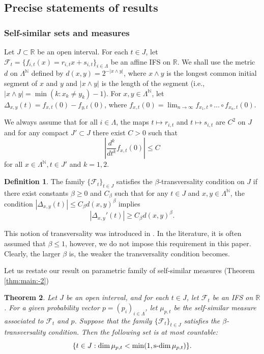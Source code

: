 \documentclass[a4paper,11pt]{amsart}
\newtheorem{theorem}{Theorem}[section]
\theoremstyle{definition}
\newtheorem{definition}[theorem]{Definition}
\numberwithin{equation}{section}
\def\to{\rightarrow}
\def\F{\mathcal F}
\def\N{\mathbb N}
\def\R{\mathbb R}
\DeclareMathOperator{\sd}{{\rm{s}\textrm{-}\rm{dim}}}
\begin{document}
\subsection{Precise statements of results}\label{section: precise-statements-results:0}
\subsubsection{Self-similar sets and measures}\label{section: result-projection-measure-self-similar-IFS:1}

Let $J\subset \R$ be an open interval. For each $t\in J$, let $\F_t=\{f_{i,t}(x)=r_{i,t}x+s_{i,t}\}_{i\in \Lambda}$ be an affine IFS on $\R$.  We shall use the metric $d$ on $\Lambda^\N$ defined by $d(x,y)=2^{-|x\wedge y|}$,  where $x\wedge y$ is the longest common initial segment of $x$ and $y$ and $|x\wedge y|$ is the length of the segment (i.e.,  $|x\wedge y|=\min(k:x_k\neq y_k)-1$).  For $x,y\in \Lambda^\N$, let $\Delta_{x,y}(t)=f_{x,t}(0)-f_{y,t}(0)$,  where $f_{x,t}(0)=\lim_{n\to \infty} f_{x_1,t}\circ\ldots \circ f_{x_n,t}(0)$.    

We always assume that for all $i\in \Lambda$, the maps $t\mapsto r_{i,t}$ and  $t\mapsto s_{i,t}$ are $C^2$ on $J$ and  for any compact $J'\subset J$  there exist $C>0$ such that 
\begin{equation}\label{eq:definition-IFS-regularity:1}
\left|\frac{d^k}{dt^k}f_{x,t}(0)\right| \le C 
\end{equation}
for all $x\in \Lambda^\N,  t\in J'$ and $k=1,2$.
\begin{definition}\label{definition:transversality:1}
The family $\{\F_t\}_{t\in J}$ satisfies the $\beta$-transversality condition on $J$ if there exist constants $\beta\ge 0$ and  $C_\beta$ such that for any $t\in J$ and $x,y\in \Lambda^\N$,  the condition $|\Delta_{x,y}(t)|\le C_\beta d(x,y)^\beta$ implies 
\begin{equation}\label{eq:definition-tranversal:1}
|\Delta_{x,y}'(t)|\ge C_\beta d(x,y)^\beta.  
\end{equation}
\end{definition}

This notion of transversality was introduced in \cite{Peres-Schlag}. In the literature, it is often assumed that $\beta\le 1$,  however, we do not impose this requirement in this paper. Clearly, the larger $\beta$  is, the weaker the transversality condition becomes.

Let us restate our result on parametric family of self-similar measures (Theorem \ref{thm:main:-2})  
\begin{theorem}\label{thm:proj-parametric-self-similar:1}
Let $J$ be an open  interval, and for each $t\in J$, let $\F_t$ be an IFS on $\R$. For a given probability vector $p=(p_i)_{i\in \Lambda}$, let $\mu_{p,t}$ be the self-similar measure associated to $\F_t$ and $p$.  Suppose that the family $\{\F_t\}_{t\in J}$ satisfies the $\beta$-transversality condition.  Then the following set is at most countable:
\[
\{t\in J: \dim \mu_{p,t}<\min (1,\sd \mu_{p,t})\}.
\]
\end{theorem}
\end{document}
